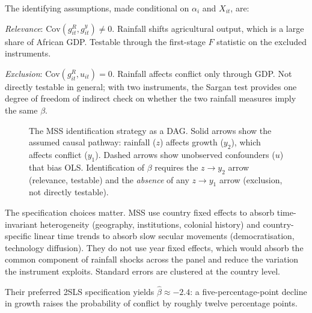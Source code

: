 \documentclass[11pt,a4paper]{article}
\begin{document}
The identifying assumptions, made conditional on $\alpha_i$ and $X_{it}$, are:

\textit{Relevance}: $\mathrm{Cov}(g^{R}_{it}, g^{y}_{it}) \neq 0$. Rainfall shifts
agricultural output, which is a large share of African GDP. Testable through the
first-stage $F$ statistic on the excluded instruments.

\textit{Exclusion}: $\mathrm{Cov}(g^{R}_{it}, u_{it}) = 0$. Rainfall affects
conflict only through GDP. Not directly testable in general; with two
instruments, the Sargan test provides one degree of freedom of indirect check on
whether the two rainfall measures imply the same $\beta$.

\begin{figure}[H]
\centering
{}
\caption{The MSS identification strategy as a DAG. Solid arrows show the
assumed causal pathway: rainfall ($z$) affects growth ($y_2$), which affects
conflict ($y_1$). Dashed arrows show unobserved confounders ($u$) that bias
OLS. Identification of $\beta$ requires the $z \to y_2$ arrow (relevance,
testable) and the \emph{absence} of any $z \to y_1$ arrow (exclusion, not
directly testable).}
\label{fig:dag-mss}
\end{figure}

The specification choices matter. MSS use country fixed effects to absorb
time-invariant heterogeneity (geography, institutions, colonial history) and
country-specific linear time trends to absorb slow secular movements
(democratisation, technology diffusion). They do not use year fixed effects,
which would absorb the common component of rainfall shocks across the panel
and reduce the variation the instrument exploits. Standard errors are clustered
at the country level.

Their preferred 2SLS specification yields $\hat\beta \approx -2.4$: a
five-percentage-point decline in growth raises the probability of conflict by
roughly twelve percentage points.
\end{document}
